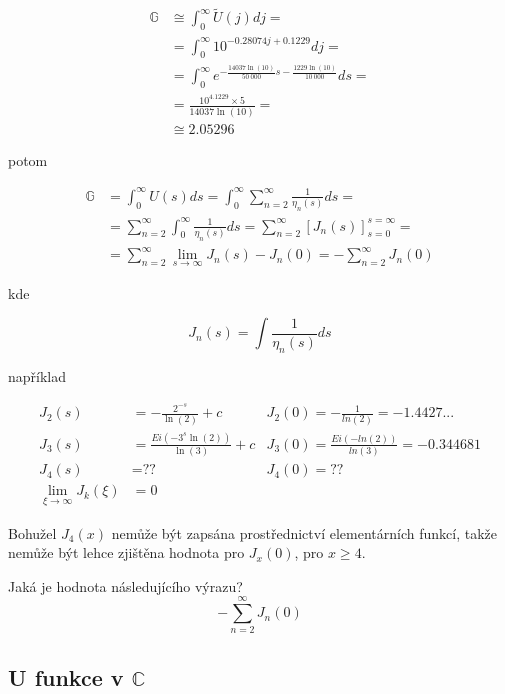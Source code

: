 \begin{align}
      \mathbb{G} &\cong \int_0^\infty \tilde{U}(j) dj =\\
      &= \int_0^\infty  10^{-0.28074j + 0.1229} dj =\\
      &= \int_0^\infty e^{-\frac{14037 \ln(10)}{50 \ 000}s -
      \frac{1229 \ln(10)}{10 \ 000}} ds= \\
      &= \frac{10^{4.1229}\times 5}{14037 \ln(10)} =\\
      &\cong 2.05296
\end{align}

potom

\begin{align}
      \mathbb{G} &= \int_0^{\infty} U(s) ds =\int_0^\infty 
      \sum_{n=2}^{\infty} \frac{1}{\eta_n(s)} ds =\\
            &=\sum_{n=2}^{\infty} \int_0^\infty \frac{1}{\eta_n(s)}
      ds = \sum_{n=2}^\infty [J_n(s) ]_{s=0}^{s=\infty} =\\
      &= \sum_{n=2}^\infty \lim_{s \to \infty} J_n(s) - J_n(0) 
      = -\sum_{n=2}^\infty J_n(0) 
\end{align}

kde

\[J_n(s) = \int \frac{1}{\eta_n(s)} ds\]

například 

\begin{align}
      J_2(s) &= -\frac{2^{-s}}{\ln(2)} + 
      c & J_2(0) = -\frac{1}{ln(2)} = -1.4427... \\
      J_3(s) &= \frac{Ei(-3^s \ln(2))}{\ln(3)} 
      + c & J_3(0)=  \frac{Ei(-ln(2))}{ln(3)} = -0.344681 \\
      J_4(s) &= \mbox{??} & J_4(0) = \mbox{??} \\
      \lim_{\xi \to \infty} J_{k}(\xi) &= 0
\end{align}

Bohužel \(J_4(x)\) nemůže být zapsána prostřednictví 
elementárních funkcí, takže nemůže být lehce zjištěna
hodnota pro \(J_x(0)\), pro \(x \geq 4\).
      
\begin{question}
      Jaká je hodnota následujícího výrazu?
      \[-\sum_{n=2}^\infty J_n(0) \]
\end{question}

\subsection{U funkce v \(\mathbb{C}\)}

